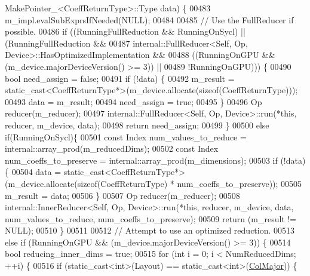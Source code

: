 \begin{DoxyCode}
      MakePointer\_<CoeffReturnType>::Type data) \{
00483     m\_impl.evalSubExprsIfNeeded(NULL);
00484 
00485     \textcolor{comment}{// Use the FullReducer if possible.}
00486     \textcolor{keywordflow}{if} ((RunningFullReduction && RunningOnSycl) ||(RunningFullReduction &&
00487         internal::FullReducer<Self, Op, Device>::HasOptimizedImplementation &&
00488         ((RunningOnGPU && (m\_device.majorDeviceVersion() >= 3)) ||
00489          !RunningOnGPU))) \{
00490       \textcolor{keywordtype}{bool} need\_assign = \textcolor{keyword}{false};
00491       \textcolor{keywordflow}{if} (!data) \{
00492         m\_result = \textcolor{keyword}{static\_cast<}CoeffReturnType*\textcolor{keyword}{>}(m\_device.allocate(\textcolor{keyword}{sizeof}(CoeffReturnType)));
00493         data = m\_result;
00494         need\_assign = \textcolor{keyword}{true};
00495       \}
00496       Op reducer(m\_reducer);
00497       internal::FullReducer<Self, Op, Device>::run(*\textcolor{keyword}{this}, reducer, m\_device, data);
00498       \textcolor{keywordflow}{return} need\_assign;
00499     \}
00500     \textcolor{keywordflow}{else} \textcolor{keywordflow}{if}(RunningOnSycl)\{
00501       \textcolor{keyword}{const} Index num\_values\_to\_reduce = internal::array\_prod(m\_reducedDims);
00502       \textcolor{keyword}{const} Index num\_coeffs\_to\_preserve = internal::array\_prod(m\_dimensions);
00503       \textcolor{keywordflow}{if} (!data) \{
00504         data = \textcolor{keyword}{static\_cast<}CoeffReturnType*\textcolor{keyword}{>}(m\_device.allocate(\textcolor{keyword}{sizeof}(CoeffReturnType) * 
      num\_coeffs\_to\_preserve));
00505         m\_result = data;
00506       \}
00507       Op reducer(m\_reducer);
00508       internal::InnerReducer<Self, Op, Device>::run(*\textcolor{keyword}{this}, reducer, m\_device, data, num\_values\_to\_reduce, 
      num\_coeffs\_to\_preserve);
00509       \textcolor{keywordflow}{return} (m\_result != NULL);
00510     \}
00511 
00512     \textcolor{comment}{// Attempt to use an optimized reduction.}
00513     \textcolor{keywordflow}{else} \textcolor{keywordflow}{if} (RunningOnGPU && (m\_device.majorDeviceVersion() >= 3)) \{
00514       \textcolor{keywordtype}{bool} reducing\_inner\_dims = \textcolor{keyword}{true};
00515       \textcolor{keywordflow}{for} (\textcolor{keywordtype}{int} i = 0; i < NumReducedDims; ++i) \{
00516         \textcolor{keywordflow}{if} (static\_cast<int>(Layout) == \textcolor{keyword}{static\_cast<}\textcolor{keywordtype}{int}\textcolor{keyword}{>}(\hyperlink{group__enums_ggaacded1a18ae58b0f554751f6cdf9eb13a0cbd4bdd0abcfc0224c5fcb5e4f6669a}{ColMajor})) \{

\end{DoxyCode}

